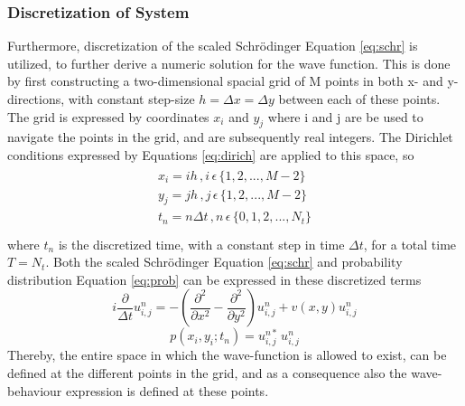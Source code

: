 \documentclass[10pt, nofootinbib, twocolumn]{revtex4-1}
\begin{document}
\subsubsection{Discretization of System}
Furthermore, discretization of the scaled Schrödinger Equation \eqref{eq:schr} is utilized, to further derive a numeric solution for the wave function. This is done by first constructing a two-dimensional spacial grid of M points in both x- and y-directions, with constant step-size $h=\Delta x = \Delta y$ between each of these points. The grid is expressed by coordinates $x_i$ and $y_j$
where i and j are be used to navigate the points in the grid, and are subsequently real integers. The Dirichlet conditions expressed by Equations \eqref{eq:dirich} are applied to this space, so 
\begin{align}
    \begin{split}
        x_i=ih \, , i \, \epsilon \, \{1,2,...,M-2\} \\
        y_j=jh \, , j \, \epsilon \, \{1,2,...,M-2\} \\
        t_n = n\Delta t \, , n \, \epsilon \, \{0,1,2,...,N_t\}  \\
    \end{split}
\end{align}
where $t_n$ is the discretized time, with a constant step in time $\Delta t$, for a total time $T=N_t$. Both the scaled Schrödinger Equation \eqref{eq:schr} and probability distribution Equation \eqref{eq:prob} can be expressed in these discretized terms
\begin{equation}\label{eq:schrdis}
    i \frac{\partial}{\Delta t} u^n_{i,j}= -(\frac{\partial^2 }{\partial x^2} - \frac{\partial^2 }{\partial y^2})u^n_{i,j} + v(x,y) u^n_{i,j}
\end{equation}
\begin{equation}\label{eq:probdis}
    p(x_i,y_i;t_n) = u^{n*}_{i,j} \, u^n_{i,j}
\end{equation}
Thereby, the entire space in which the wave-function is allowed to exist, can be defined at the different points in the grid, and as a consequence also the wave-behaviour expression is defined at these points.
\end{document}

